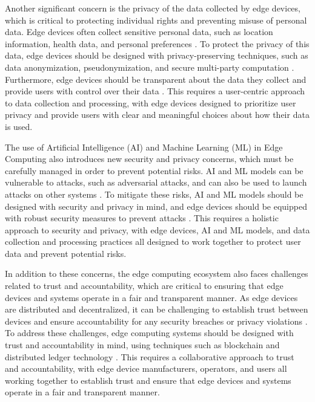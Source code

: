 \documentclass[11pt,a4paper]{article}
\begin{document}
Another significant concern is the privacy of the data collected by edge devices, which is critical to protecting individual rights and preventing misuse of personal data. Edge devices often collect sensitive personal data, such as location information, health data, and personal preferences \cite{arxiv:2402.13056}. To protect the privacy of this data, edge devices should be designed with privacy-preserving techniques, such as data anonymization, pseudonymization, and secure multi-party computation \cite{arxiv:2109.12195}. Furthermore, edge devices should be transparent about the data they collect and provide users with control over their data \cite{arxiv:1910.05316}. This requires a user-centric approach to data collection and processing, with edge devices designed to prioritize user privacy and provide users with clear and meaningful choices about how their data is used.

The use of Artificial Intelligence (AI) and Machine Learning (ML) in Edge Computing also introduces new security and privacy concerns, which must be carefully managed in order to prevent potential risks. AI and ML models can be vulnerable to attacks, such as adversarial attacks, and can also be used to launch attacks on other systems \cite{arxiv:1907.08349}. To mitigate these risks, AI and ML models should be designed with security and privacy in mind, and edge devices should be equipped with robust security measures to prevent attacks \cite{arxiv:1905.10083}. This requires a holistic approach to security and privacy, with edge devices, AI and ML models, and data collection and processing practices all designed to work together to protect user data and prevent potential risks.

In addition to these concerns, the edge computing ecosystem also faces challenges related to trust and accountability, which are critical to ensuring that edge devices and systems operate in a fair and transparent manner. As edge devices are distributed and decentralized, it can be challenging to establish trust between devices and ensure accountability for any security breaches or privacy violations \cite{arxiv:2309.05416}. To address these challenges, edge computing systems should be designed with trust and accountability in mind, using techniques such as blockchain and distributed ledger technology \cite{arxiv:2304.14271}. This requires a collaborative approach to trust and accountability, with edge device manufacturers, operators, and users all working together to establish trust and ensure that edge devices and systems operate in a fair and transparent manner.
\end{document}
